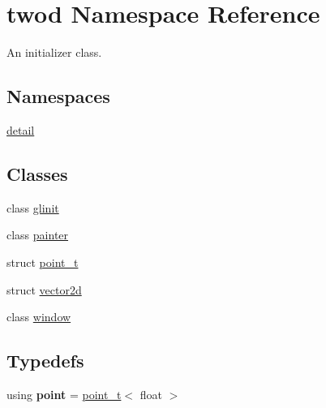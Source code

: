 \hypertarget{namespacetwod}{}\section{twod Namespace Reference}
\label{namespacetwod}


An initializer class.  


\subsection*{Namespaces}
\begin{DoxyCompactItemize}
\item 
 \hyperlink{namespacetwod_1_1detail}{detail}
\end{DoxyCompactItemize}
\subsection*{Classes}
\begin{DoxyCompactItemize}
\item 
class \hyperlink{classtwod_1_1glinit}{glinit}
\item 
class \hyperlink{classtwod_1_1painter}{painter}
\item 
struct \hyperlink{structtwod_1_1point__t}{point\+\_\+t}
\item 
struct \hyperlink{structtwod_1_1vector2d}{vector2d}
\item 
class \hyperlink{classtwod_1_1window}{window}
\end{DoxyCompactItemize}
\subsection*{Typedefs}
\begin{DoxyCompactItemize}
\item 
\mbox{\label{namespacetwod_a24fdc9a6bd8f1f56a15b26cd00db05b7}} 
using {\bfseries point} = \hyperlink{structtwod_1_1point__t}{point\+\_\+t}$<$ float $>$
\end{DoxyCompactItemize}
